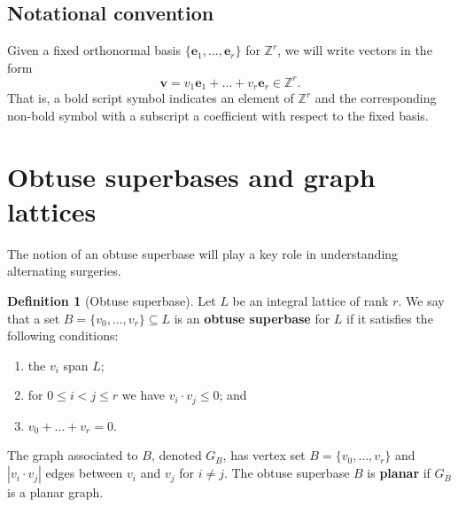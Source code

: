 \documentclass{amsart} %
\newcommand{\Z}{\mathbb{Z}}
\newcommand{\e}{\bm{e}}
\newcommand{\bv}{\bm{v}}
\theoremstyle{thm}
\theoremstyle{definition}
\newtheorem{defi}[Theorem]{Definition}
\numberwithin{equation}{section}
\begin{document}
\subsection*{Notational convention} Given a fixed orthonormal basis $\{\e_1, \dots, \e_r\}$ for $\Z^r$, we will write vectors in the form
\[
\bv=v_1 \e_1 + \dots +v_r\e_r\in \Z^r.
\]
That is, a bold script symbol indicates an element of $\Z^r$ and the corresponding non-bold symbol with a subscript a coefficient with respect to the fixed basis. 

\section{Obtuse superbases and graph lattices}\label{sec:OSB}
The notion of an obtuse superbase will play a key role in understanding alternating surgeries.
\begin{defi}[Obtuse superbase]
Let $L$ be an integral lattice of rank $r$. We say that a set $B=\{v_0, \dots, v_r\}\subseteq L$ is an \textbf{obtuse superbase} for $L$ if it satisfies the following conditions:
\begin{enumerate}[label = (\alph*)]
    \item the $v_i$ span $L$;
    \item for $0\leq i <j \leq r$ we have $v_i \cdot v_j\leq 0$; and
    \item $v_0+ \dots + v_r=0$.
\end{enumerate}
The graph associated to $B$, denoted $G_B$, has vertex set $B=\{v_0, \dots, v_r\}$ and $|v_i \cdot v_j|$ edges between $v_i$ and $v_j$ for $i\neq j$. The obtuse superbase $B$ is \textbf{planar} if $G_B$ is a planar graph.
\end{defi}
\end{document}
